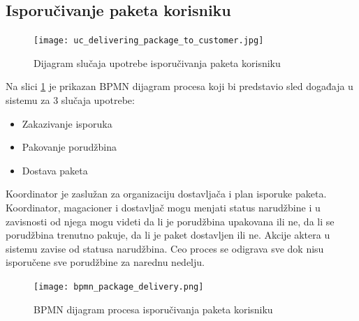 \subsection{Isporučivanje paketa korisniku}
\begin{figure}[H]
	\begin{center}
		\texttt{[image: uc\_delivering\_package\_to\_customer.jpg]}
	\end{center}
    \caption{Dijagram slučaja upotrebe isporučivanja paketa korisniku}
\end{figure}

Na slici \ref{fig:bpmnPackageDelivery} je prikazan BPMN dijagram procesa koji bi predstavio sled događaja u sistemu za 3 slučaja upotrebe: 
\begin{itemize}
	\item{Zakazivanje isporuka}
	\item{Pakovanje porudžbina }
	\item{Dostava paketa}
\end{itemize}

Koordinator je zaslužan za organizaciju dostavljača i plan isporuke paketa. Koordinator, magacioner i dostavljač mogu menjati status narudžbine i u zavisnosti od njega mogu videti da li je porudžbina upakovana ili ne, da li se porudžbina trenutno pakuje, da li je paket dostavljen ili ne. Akcije aktera u sistemu zavise od statusa narudžbina. Ceo proces se odigrava sve dok nisu isporučene sve porudžbine za narednu nedelju.


\begin{figure}[H]
	\begin{center}
		\texttt{[image: bpmn\_package\_delivery.png]}
	\end{center}
    \caption{BPMN dijagram procesa isporučivanja paketa korisniku}
    \label{fig:bpmnPackageDelivery}
\end{figure}


